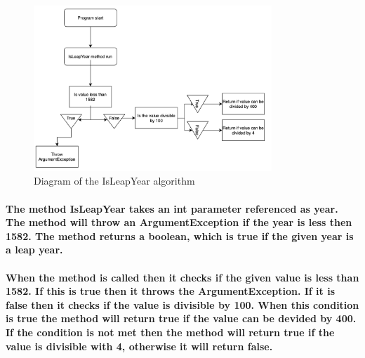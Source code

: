 \documentclass[12pt]{article}
\begin{document}
\maketitle
\begin{figure}[h]
    \centering
    \includegraphics[width=0.8\textwidth]{images/UML_chart.png}
    \caption{Diagram of the IsLeapYear algorithm}
\end{figure}

\paragraph{The method IsLeapYear takes an int parameter referenced as year. The method will throw an ArgumentException if the year is less then 1582. The method returns a boolean, which is true if the given year is a leap year.\\\\
When the method is called then it checks if the given value is less than 1582. If this is true then it throws the ArgumentException. If it is false then it checks if the value is divisible by 100. When this condition is true the method will return true if the value can be devided by 400. If the condition is not met then the method will return true if the value is divisible with 4, otherwise it will return false.}
\end{document}
